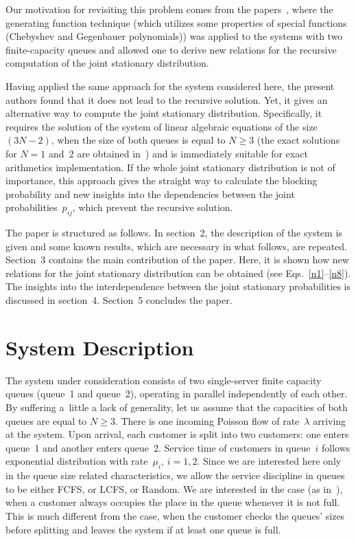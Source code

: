 \begin{multicols}{2}
Our motivation for revisiting this problem comes
from the papers~\cite{xx1,xx2,xx3,NEW2,NEW3}, where the generating 
function technique (which utilizes some properties 
of special functions (Chebyshev and Gegenbauer
polynomials)) was applied to the systems with 
two finite-capacity queues 
and allowed one to derive 
new relations for the recursive computation of the 
joint stationary distribution. 

      
Having applied the same
approach for the system considered here, 
the present authors found that it does not lead to the recursive solution. 
Yet, it gives an alternative way to compute the joint stationary distribution. 
Specifically, it requires the solution of the system of linear algebraic equations
of the size $(3N-2)$, when the size of both queues
is equal  to $N\ge3$ 
(the exact solutions for $N=1$ and~2
are obtained in~\cite{orig2}) and is immediately suitable for exact 
arithmetics implementation.
If the whole joint stationary distribution is not
of importance, this approach gives the straight way to 
calculate the blocking probability
and new insights into the dependencies between the
joint probabilities~$p_{ij}$, which prevent the recursive solution. 

The paper is structured as follows. In section~2,
the description of the system is given and some known results,
which are necessary in what follows, are repeated.
Section~3 contains the main contribution of the paper. Here,
it is shown how new relations for the joint stationary distribution
can be obtained (see Eqs.~\eqref{n1}--\eqref{n8}). 
The insights into the interdependence between the joint 
stationary probabilities is discussed in section~4.
Section~5 concludes the paper.


\section{System Description}

\noindent
The system under consideration consists of two single-server
finite capacity queues (queue~1 and queue~2), operating in parallel
independently of each other.
By suffering a~little a lack of generality, let us assume 
that the capacities of both queues are equal to $N\ge3$.
There is one incoming Poisson flow of rate~$\lambda$
arriving at the system. Upon arrival,
each customer is split into two customers:
one enters queue~1 and another enters queue~2.
Service time of customers in queue~$i$ follows
exponential distribution with rate~$\mu_i$, $i=1,2$.
Since we are interested here only in the queue size related
characteristics, we allow the service discipline in queues
to be either FCFS, or LCFS, or Random.
We are interested in the case (as in~\cite{orig1}), when 
a customer always occupies the place in the queue 
whenever it is not full. This is much different
from the case, when the customer checks the queues' sizes before 
splitting and leaves the system if at least one queue is full. 


\end{multicols}

